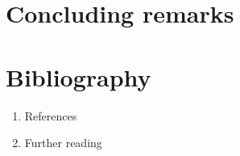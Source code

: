 \documentclass[a4paper,11pt]{article}
\begin{document}
   
\section{Concluding remarks}
   \begin{enumerate}
   \end{enumerate}
   
   
   
\section{Bibliography}
   \begin{enumerate}
     \item References
     \item Further reading
   \end{enumerate}
   
         
\end{document}
